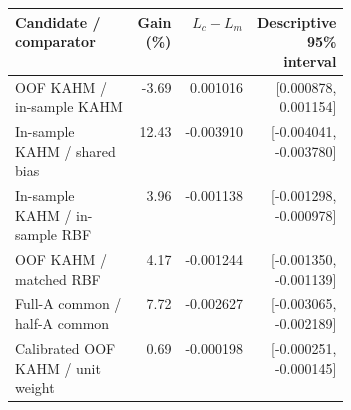 \begin{tabular}{@{}p{0.39\linewidth}rrr@{}}
\toprule
Candidate / comparator & Gain (\%) & $L_c-L_m$ & Descriptive 95\% interval \\
\midrule
OOF KAHM / in-sample KAHM & -3.69 & 0.001016 & [0.000878, 0.001154] \\
In-sample KAHM / shared bias & 12.43 & -0.003910 & [-0.004041, -0.003780] \\
In-sample KAHM / in-sample RBF & 3.96 & -0.001138 & [-0.001298, -0.000978] \\
OOF KAHM / matched RBF & 4.17 & -0.001244 & [-0.001350, -0.001139] \\
Full-A common / half-A common & 7.72 & -0.002627 & [-0.003065, -0.002189] \\
Calibrated OOF KAHM / unit weight & 0.69 & -0.000198 & [-0.000251, -0.000145] \\
\bottomrule
\end{tabular}
